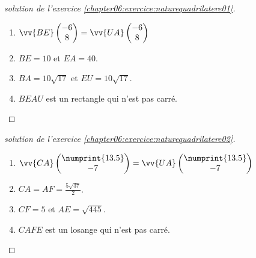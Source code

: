 \begin{proof}[solution de l'exercice  \ref{chapter06:exercice:naturequadrilatere01}]   \hfill
	
	\begin{enumerate}[label=\alph*)]
		\item $\vv{BE}\begin{pmatrix}
			-6\\ 8 
		\end{pmatrix} =\vv{UA}\begin{pmatrix}
			-6\\ 8
		\end{pmatrix}$
		\item  $BE=10$  et $EA =40$.
		\item $BA=10\sqrt{17}$ et $EU=10\sqrt{17}$.
		\item $BEAU$ est un rectangle qui n'est pas carré.
	\end{enumerate} 
\end{proof}
\begin{proof}[solution de l'exercice  \ref{chapter06:exercice:naturequadrilatere02}]  \hfill  
	
	\begin{enumerate}[label=\alph*)]
		\item $\vv{CA}\begin{pmatrix}
			\numprint{13.5}\\ -7 
		\end{pmatrix} =\vv{UA}\begin{pmatrix}
			\numprint{13.5}\\ -7 
		\end{pmatrix}$
		\item $CA=AF=\tfrac{5\sqrt{37}}{2}$.
		\item $CF=5$ et $AE=\sqrt{445}$.
		\item $CAFE$ est un losange qui n'est pas carré.
	\end{enumerate} 
\end{proof}

